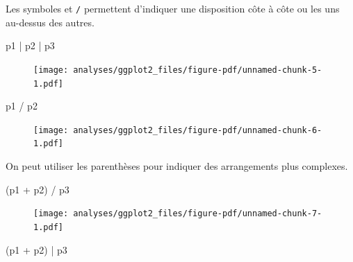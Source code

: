 \documentclass[
  letterpaper,
  DIV=11,
  numbers=noendperiod,
  oneside]{scrreprt}
\newenvironment{Shaded}{\begin{snugshade}}{\end{snugshade}}
\newcommand{\NormalTok}[1]{\textcolor[rgb]{0.00,0.23,0.31}{#1}}
\newcommand{\SpecialCharTok}[1]{\textcolor[rgb]{0.37,0.37,0.37}{#1}}
\begin{document}
Les symboles \texttt{\textbar{}} et \texttt{/} permettent d'indiquer une
disposition côte à côte ou les uns au-dessus des autres.

\begin{Shaded}
\begin{Highlighting}[]
\NormalTok{p1 }\SpecialCharTok{|}\NormalTok{ p2 }\SpecialCharTok{|}\NormalTok{ p3}
\end{Highlighting}
\end{Shaded}

\begin{figure}[H]

{\centering \texttt{[image: analyses/ggplot2\_files/figure-pdf/unnamed-chunk-5-1.pdf]}

}

\end{figure}

\begin{Shaded}
\begin{Highlighting}[]
\NormalTok{p1 }\SpecialCharTok{/}\NormalTok{ p2}
\end{Highlighting}
\end{Shaded}

\begin{figure}[H]

{\centering \texttt{[image: analyses/ggplot2\_files/figure-pdf/unnamed-chunk-6-1.pdf]}

}

\end{figure}

On peut utiliser les parenthèses pour indiquer des arrangements plus
complexes.

\begin{Shaded}
\begin{Highlighting}[]
\NormalTok{(p1 }\SpecialCharTok{+}\NormalTok{ p2) }\SpecialCharTok{/}\NormalTok{ p3}
\end{Highlighting}
\end{Shaded}

\begin{figure}[H]

{\centering \texttt{[image: analyses/ggplot2\_files/figure-pdf/unnamed-chunk-7-1.pdf]}

}

\end{figure}

\begin{Shaded}
\begin{Highlighting}[]
\NormalTok{(p1 }\SpecialCharTok{+}\NormalTok{ p2) }\SpecialCharTok{|}\NormalTok{ p3}
\end{Highlighting}
\end{Shaded}
\end{document}
